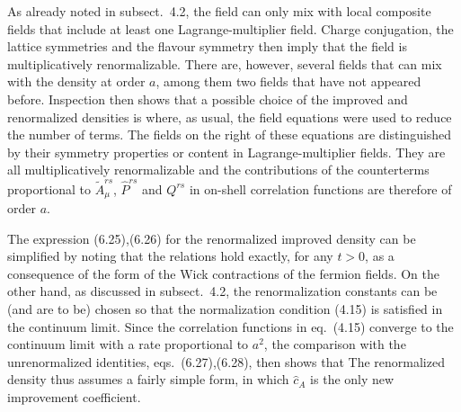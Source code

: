 As already noted in subsect.~4.2, the field
can only mix with 
local composite fields that include at least one Lagrange-multiplier 
field. Charge conjugation, the lattice symmetries and the flavour symmetry
then imply that the field is multiplicatively renormalizable. 
There are, however, several fields that can mix 
with the density at order $a$,
among them two fields
that have not appeared before.
Inspection then shows that 
a possible choice of the improved and renormalized densities is
where, as usual, the field equations were used to reduce the
number of terms.
The fields on the right of these equations 
are distinguished by their symmetry properties or content in
Lagrange-multiplier fields.
They are all multiplicatively renormalizable and the contributions
of the counterterms proportional to $\tilde{A}_{\mu}^{rs}$, $\hat{P}^{rs}$ and
$Q^{rs}$ in on-shell correlation functions are therefore of order $a$.

The expression (6.25),(6.26) for the renormalized improved density
can be simplified by noting that the relations
hold exactly, for any $t>0$, as a consequence of
the form of the Wick contractions of the fermion fields. 
On the other hand, as discussed
in subsect.~4.2, the renormalization
constants can be (and are to be) chosen so that the normalization 
condition (4.15) is satisfied in the continuum limit.
Since the correlation functions in eq.~(4.15) converge to the
continuum limit with a rate proportional to $a^2$,
the comparison with the unrenormalized identities, eqs.~(6.27),(6.28),
then shows that
The renormalized density 
thus assumes a fairly simple form,
in which $\hat{c}_A$ is the only new improvement coefficient.


